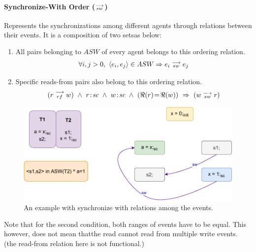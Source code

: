     \paragraph{Synchronize-With Order ($\stackrel{\longrightarrow}{_{sw}} $)}
        Represents the synchronizations among different agents through relations between their events. It is a composition of two setsas below: 
        \begin{enumerate}
            \item All pairs belonging to $ASW$ of every agent belongs to this ordering relation. 
                \begin{align*}
                    \forall{i, j > 0}, \ \langle e_i, e_j \rangle \in ASW \Rightarrow{} e_i\stackrel{\longrightarrow}{_{sw}}e_j 
                \end{align*}
                    
            \item Specific reads-from pairs also belong to this ordering relation. 
                \begin{align*}
                    (\reln{r}{rf}{w}) \ \wedge \ \et{r}{sc} \ \wedge \ \et{w}{sc} \ \wedge \ (\Re(r)\!=\!\Re(w)) \ \Rightarrow{} \
                    (\reln{w}{sw}{r})
                \end{align*}
                    
        \end{enumerate}
        
        \begin{figure}[H]
            \centering
            \includegraphics[scale=0.7]{ECMAScriptMemoryModel/SynchronizeWith.pdf}
            \caption{An example with synchronize with relations among the events.}
        \end{figure}

         {Note that for the second condition, both ranges of events have to be equal. This however, does not mean thatthe read cannot read from multiple write events. (the read-from relation here is not functional.)}
        
